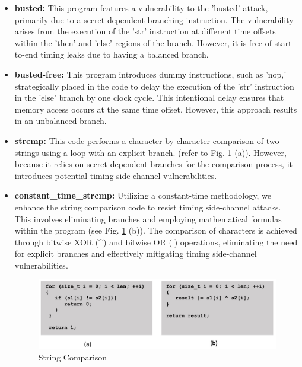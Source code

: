 \begin{itemize}
    \item \textbf{busted:} This program features a vulnerability to the 'busted' attack, primarily due to a secret-dependent branching instruction. The vulnerability arises from the execution of the 'str' instruction at different time offsets within the 'then' and 'else' regions of the branch. However, it is free of start-to-end timing leaks due to having a balanced branch.

    \item \textbf{busted-free:} This program introduces dummy instructions, such as 'nop,' strategically placed in the code to delay the execution of the 'str' instruction in the 'else' branch by one clock cycle. This intentional delay ensures that memory access occurs at the same time offset. However, this approach results in an unbalanced branch.

    \item \textbf{strcmp:} This code performs a character-by-character comparison of two strings using a loop with an explicit branch. (refer to Fig. \ref{fig:string} (a)). However, because it relies on secret-dependent branches for the comparison process, it introduces potential timing side-channel vulnerabilities.

    \item \textbf{ constant\_time\_strcmp:} Utilizing a constant-time methodology, we enhance the string comparison code to resist timing side-channel attacks. This involves eliminating branches and employing mathematical formulas within the program (see Fig. \ref{fig:string} (b)). The comparison of characters is achieved through bitwise XOR (\textasciicircum) and bitwise OR ($|$) operations, eliminating the need for explicit branches and effectively mitigating timing side-channel vulnerabilities.

 \begin{figure}
  \centering
  \medskip
  \includegraphics[width=.9\textwidth]{figures/string.jpg}
  \caption[Short caption for Table of Figures]{String Comparison}
  \label{fig:string}
\end{figure}


\end{itemize}
